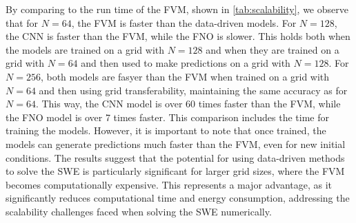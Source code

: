 By comparing to the run time of the FVM, shown in \autoref{tab:scalability}, we observe that for $N = 64$, the FVM is faster than the data-driven models.
For $N = 128$, the CNN is faster than the FVM, while the FNO is slower.
This holds both when the models are trained on a grid with $N = 128$ and when they are trained on a grid with $N = 64$ and then used to make predictions on a grid with $N = 128$.
For $N = 256$, both models are fasyer than the FVM when trained on a grid with $N = 64$ and then using grid transferability, maintaining the same accuracy as for $N = 64$.
This way, the CNN model is over 60 times faster than the FVM, while the FNO model is over 7 times faster.
This comparison includes the time for training the models.
However, it is important to note that once trained, the models can generate predictions much faster than the FVM, even for new initial conditions.
The results suggest that the potential for using data-driven methods to solve the SWE is particularly significant for larger grid sizes, where the FVM becomes computationally expensive.
This represents a major advantage, as it significantly reduces computational time and energy consumption, addressing the scalability challenges faced when solving the SWE numerically.


